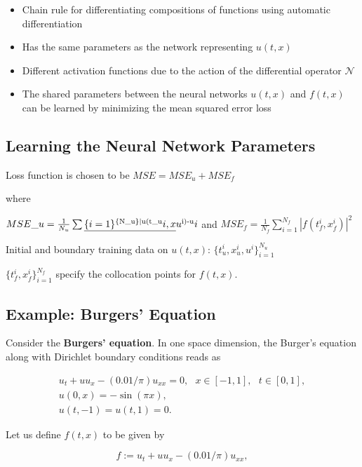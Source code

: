 \documentclass[book.tex]{subfiles}
\begin{document}
\begin{itemize}
\itemsep1pt\parskip0pt
\item
  Chain rule for differentiating compositions of functions using
  automatic differentiation
\item
  Has the same parameters as the network representing $u(t, x)$
\item
  Different activation functions due to the action of the differential
  operator $\mathcal{N}$
\item
  The shared parameters between the neural networks $u(t, x)$ and
  $f(t, x)$ can be learned by minimizing the mean squared error loss
\end{itemize}

\subsection{Learning the Neural Network
Parameters}\label{learning-the-neural-network-parameters}

Loss function is chosen to be $MSE=MSE_u + MSE_f$

where

$ MSE\_u=\frac{1}{N_u}
\sum\emph{\{i=1\}\textsuperscript{\{N\_u\}\textbar{}u(t\_u}i,x}u\textsuperscript{i)-u}i$
and $MSE_f=\frac{1}{N_f} \sum_{i=1}^{N_f}|f(t_f^i,x_f^i)|^2$

Initial and boundary training data on $u(t, x)$:
$\{{t^i_u, x^i_u, u^i}\}^{N_u}_{i=1}$

$\{{t^i_f, x^i_f}\}^{N_f}_{i=1}$ specify the collocation points for
$f(t, x)$.

\subsection{Example: Burgers' Equation}\label{example-burgers-equation}

Consider the \textbf{Burgers' equation}. In one space dimension, the
Burger's equation along with Dirichlet boundary conditions reads as

\[
\begin{array}{l}
u_t + u u_x - (0.01/\pi) u_{xx} = 0,\ \ \ x \in [-1,1],\ \ \ t \in [0,1],\\
u(0,x) = -\sin(\pi x),\\
u(t,-1) = u(t,1) = 0.
\end{array}
\]

Let us define $f(t,x)$ to be given by

\[
f := u_t + u u_x - (0.01/\pi) u_{xx},
\]
\end{document}
